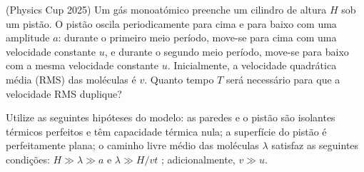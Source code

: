 (Physics Cup 2025) Um gás monoatómico preenche um cilindro de altura $H$ sob um pistão. O pistão oscila periodicamente para cima e para baixo com uma amplitude $a$: durante o primeiro meio período, move-se para cima com uma velocidade constante $u$, e durante o segundo meio período, move-se para baixo com a mesma velocidade constante $u$. Inicialmente, a velocidade quadrática média (RMS) das moléculas é $v$. Quanto tempo $T$ será necessário para que a velocidade RMS duplique? %

Utilize as seguintes hipóteses do modelo: as paredes e o pistão são isolantes térmicos perfeitos e têm capacidade térmica nula; a superfície do pistão é perfeitamente plana; o caminho livre médio das moléculas $\lambda$ satisfaz as seguintes condições: $H \gg \lambda \gg a$ e $\lambda \gg H/vt$ ; adicionalmente, $v \gg u$.

